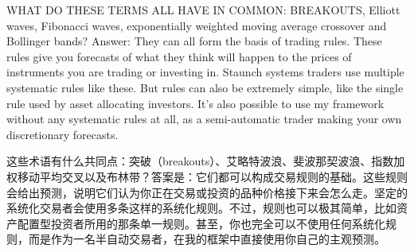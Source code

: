 
\begin{englishblock} WHAT DO THESE TERMS ALL HAVE IN COMMON: BREAKOUTS, Elliott waves, Fibonacci waves, exponentially weighted moving average crossover and Bollinger bands? Answer: They can all form the basis of trading rules. These rules give you forecasts of what they think will happen to the prices of instruments you are trading or investing in. Staunch systems traders use multiple systematic rules like these. But rules can also be extremely simple, like the single rule used by asset allocating investors. It's also possible to use my framework without any systematic rules at all, as a semi-automatic trader making your own discretionary forecasts. \end{englishblock}

\begin{chineseblock}这些术语有什么共同点：突破（breakouts）、艾略特波浪、斐波那契波浪、指数加权移动平均交叉以及布林带？答案是：它们都可以构成交易规则的基础。这些规则会给出预测，说明它们认为你正在交易或投资的品种价格接下来会怎么走。坚定的系统化交易者会使用多条这样的系统化规则。不过，规则也可以极其简单，比如资产配置型投资者所用的那条单一规则。甚至，你也完全可以不使用任何系统化规则，而是作为一名半自动交易者，在我的框架中直接使用你自己的主观预测。\end{chineseblock}


